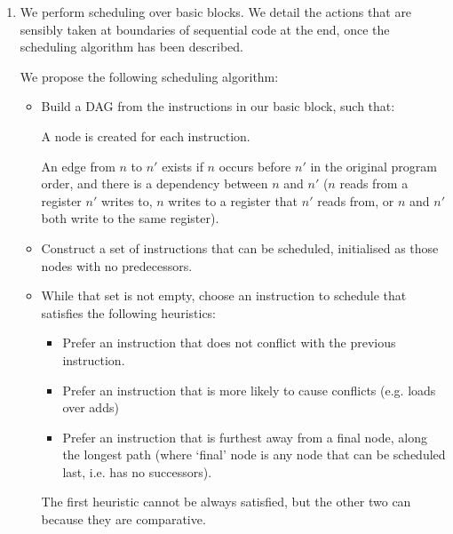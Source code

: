 


\begin{enumerate}[label=(\alph*)]

  \item

    We perform scheduling over basic blocks. We detail the actions that are sensibly taken at boundaries of sequential code at the end, once the scheduling algorithm has been described.

    We propose the following scheduling algorithm:

    \begin{itemize}
        \item
          Build a DAG from the instructions in our basic block, such that:

          A node is created for each instruction.

          An edge from $n$ to $n'$ exists if $n$ occurs before $n'$ in the original program order, and there is a dependency between $n$ and $n'$ ($n$ reads from a register $n'$ writes to, $n$ writes to a register that $n'$ reads from, or $n$ and $n'$ both write to the same register).

          \item
            Construct a set of instructions that can be scheduled, initialised as those nodes with no predecessors.

            \item
              While that set is not empty, choose an instruction to schedule that satisfies the following heuristics:

              \begin{itemize}
                  \item
                    Prefer an instruction that does not conflict with the previous instruction.

                    \item
                      Prefer an instruction that is more likely to cause conflicts (e.g. loads over adds)

                      \item
                        Prefer an instruction that is furthest away from a final node, along the longest path (where `final' node is any node that can be scheduled last, i.e. has no successors).
              \end{itemize}

              The first heuristic cannot be always satisfied, but the other two can because they are comparative.


\end{itemize}
\end{enumerate}
